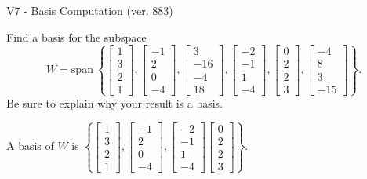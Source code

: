 \begin{exercise}
  \begin{exerciseTitle}V7 - Basis Computation (ver. 883)\end{exerciseTitle}
  \begin{exerciseStatement}
    Find a basis for the subspace 
\[W=\mathrm{span}\ \left\{\left[\begin{array}{r}
1 \\
3 \\
2 \\
1
\end{array}\right] , \left[\begin{array}{r}
-1 \\
2 \\
0 \\
-4
\end{array}\right] , \left[\begin{array}{r}
3 \\
-16 \\
-4 \\
18
\end{array}\right] , \left[\begin{array}{r}
-2 \\
-1 \\
1 \\
-4
\end{array}\right] , \left[\begin{array}{r}
0 \\
2 \\
2 \\
3
\end{array}\right] , \left[\begin{array}{r}
-4 \\
8 \\
3 \\
-15
\end{array}\right]\right\}.\]
 Be sure to explain why your result is a basis.


  \end{exerciseStatement}
  \begin{exerciseAnswer}
   A basis of \(W\) is  \(\left\{\left[\begin{array}{r}
1 \\
3 \\
2 \\
1
\end{array}\right] , \left[\begin{array}{r}
-1 \\
2 \\
0 \\
-4
\end{array}\right] , \left[\begin{array}{r}
-2 \\
-1 \\
1 \\
-4
\end{array}\right] \left[\begin{array}{r}
0 \\
2 \\
2 \\
3
\end{array}\right]\right\}\).
  


  \end{exerciseAnswer}
\end{exercise}